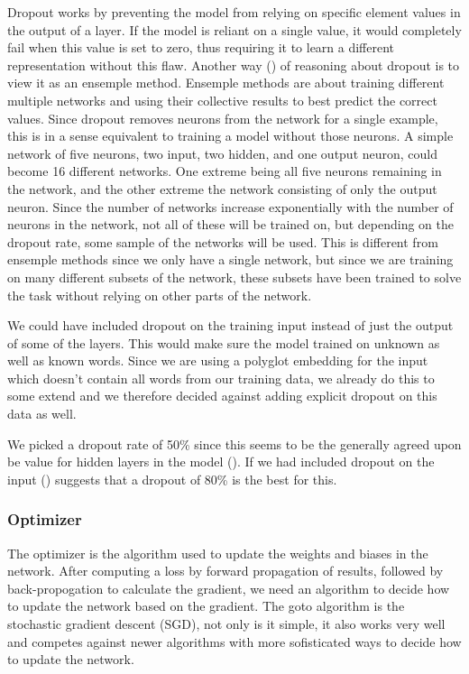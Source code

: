 Dropout works by preventing the model from relying on specific element values in
the output of a layer. If the model is reliant on a single value, it would
completely fail when this value is set to zero, thus requiring it to learn a
different representation without this flaw. Another way
(\cite{goodfellow2016deep}) of reasoning about dropout is to view it as an
ensemple method. Ensemple methods are about training different multiple networks
and using their collective results to best predict the correct values. Since
dropout removes neurons from the network for a single example, this is in a
sense equivalent to training a model without those neurons. A simple network of
five neurons, two input, two hidden, and one output neuron, could become 16
different networks. One extreme being all five neurons remaining in the network,
and the other extreme the network consisting of only the output neuron. Since
the number of networks increase exponentially with the number of neurons in the
network, not all of these will be trained on, but depending on the dropout rate,
some sample of the networks will be used. This is different from ensemple
methods since we only have a single network, but since we are training on many
different subsets of the network, these subsets have been trained to solve the
task without relying on other parts of the network. 

We could have included dropout on the training input instead of just the output
of some of the layers. This would make sure the model trained on unknown as well
as known words. Since we are using a polyglot embedding for the input which
doesn't contain all words from our training data, we already do this to some
extend and we therefore decided against adding explicit dropout on this data as
well.

We picked a dropout rate of 50\% since this seems to be the generally agreed
upon be value for hidden layers in the model (\cite{yang2018design}). If we had
included dropout on the input (\cite{goodfellow2016deep}) suggests that a dropout
of 80\% is the best for this.


\subsubsection{Optimizer}

The optimizer is the algorithm used to update the weights and biases in the
network. After computing a loss by forward propagation of results, followed by
back-propogation to calculate the gradient, we need an algorithm to decide how
to update the network based on the gradient. The goto algorithm is the
stochastic gradient descent (SGD), not only is it simple, it also works very
well and competes against newer algorithms with more sofisticated ways to decide
how to update the network.

